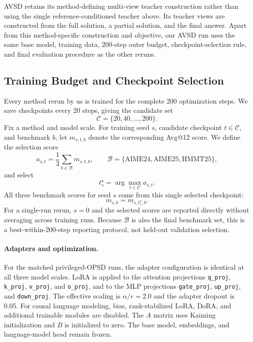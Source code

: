 \documentclass[letterpaper]{article} %
\begin{document}
AVSD retains its method-defining multi-view teacher construction rather
than using the single reference-conditioned teacher above. Its teacher
views are constructed from the full solution, a partial solution, and
the final answer. Apart from this method-specific construction and
objective, our AVSD run uses the same base model, training data,
200-step outer budget, checkpoint-selection rule, and final evaluation
procedure as the other reruns.

\subsection{Training Budget and Checkpoint Selection}
\label{sec:supp_checkpoint_selection}

Every method rerun by us is trained for the complete 200 optimization
steps. We save checkpoints every 20 steps, giving the candidate set
\begin{equation}
    \mathcal C=\{20,40,\ldots,200\}.
\end{equation}
Fix a method and model scale. For training seed $s$, candidate
checkpoint $t\in\mathcal C$, and benchmark $b$, let $m_{s,t,b}$ denote
the corresponding Avg@12 score. We define the selection score
\begin{equation}
    a_{s,t}
    =
    \frac{1}{3}
    \sum_{b\in\mathcal B}m_{s,t,b},
    \qquad
    \mathcal B=\{\mathrm{AIME24},\mathrm{AIME25},\mathrm{HMMT25}\},
    \label{eq:supp_checkpoint_score}
\end{equation}
and select
\begin{equation}
    t_s^\star
    =
    \arg\max_{t\in\mathcal C}a_{s,t}.
    \label{eq:supp_checkpoint_selection}
\end{equation}
All three benchmark scores for seed $s$ come from this single selected
checkpoint:
\begin{equation}
    m_{s,b}=m_{s,t_s^\star,b}.
    \label{eq:supp_selected_benchmark_score}
\end{equation}
For a single-run rerun, $s=0$ and the selected scores are reported
directly without averaging across training runs. Because
$\mathcal B$ is also the final benchmark set, this is a
best-within-200-step reporting protocol, not held-out validation
selection.

\paragraph{Adapters and optimization.}
For the matched privileged-OPSD runs, the adapter configuration is
identical at all three model scales.
LoRA is applied to the attention projections \texttt{q\_proj},
\texttt{k\_proj}, \texttt{v\_proj}, and \texttt{o\_proj}, and to the
MLP projections \texttt{gate\_proj}, \texttt{up\_proj}, and
\texttt{down\_proj}. The effective scaling is $\alpha/r=2.0$ and the
adapter dropout is 0.05. For causal language modeling, bias,
rank-stabilized LoRA, DoRA, and additional trainable modules are
disabled. The $A$ matrix uses Kaiming
initialization and $B$ is initialized to zero. The base model,
embeddings, and language-model head remain frozen.
\end{document}

